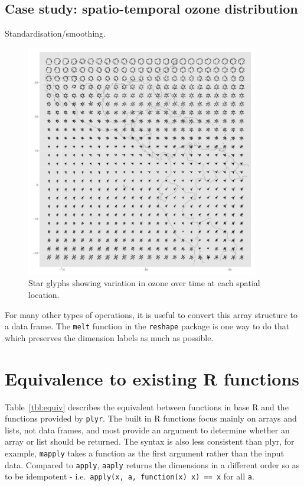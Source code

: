 \documentclass[letterpaper,oneside]{scrartcl}
\begin{document}
\subsection{Case study: spatio-temporal ozone distribution}

Standardisation/smoothing.  \citep{hobbs:2007}

\begin{figure}[htbp]
  \centering
    \includegraphics[width=4in]{ozone-glyph}
  \caption{Star glyphs showing variation in ozone over time at each spatial location.}
  \label{fig:ozone-glyph}
\end{figure}

For many other types of operations, it is useful to convert this array structure to a data frame.  The {\tt melt} function in the {\tt reshape} package is one way to do that which preserves the dimension labels as much as possible.

\section{Equivalence to existing R functions}
\label{sec:equiv}

Table~\ref{tbl:equiv} describes the equivalent between functions in base R and 
the functions provided by {\tt plyr}.  The built in R functions focus mainly on arrays and lists, not data frames, and most provide an argument to determine whether an array or list should be returned.  The syntax is also less consistent than plyr, for example, {\tt mapply} takes a function as the first argument rather than the input data.  Compared to {\tt apply}, {\tt aaply} returns the dimensions in a different order so as to be idempotent - i.e.\ {\tt apply(x, a, function(x) x) == x} for all {\tt a}. 
\end{document}
